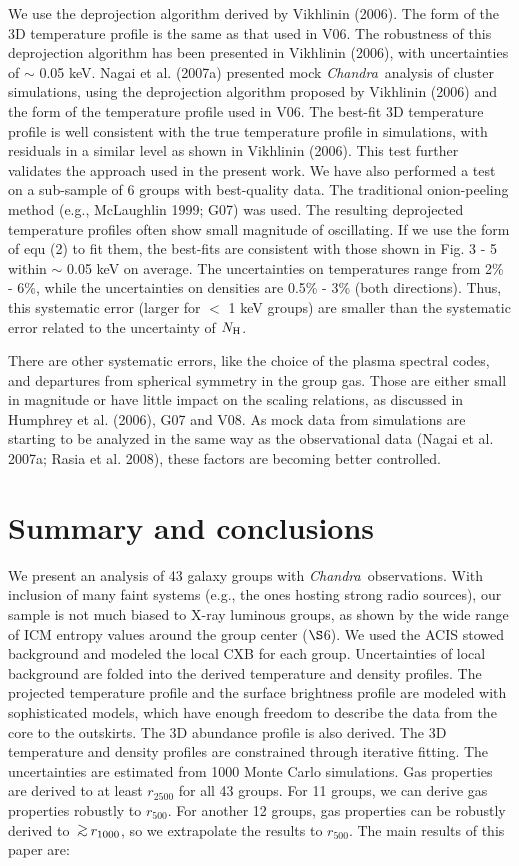 \documentclass{aastex}
\newcommand{\gsim}{\mbox{\hspace{.2em}\raisebox{.5ex}{$>$}\hspace{-.8em}\raisebox{-.5ex}{$\sim$}\hspace{.2em}}}
\def\chandra    {{\em Chandra}\/}
\begin{document}
We use the deprojection algorithm derived by Vikhlinin (2006). The form of the
3D temperature profile is the same as that used in V06.
The robustness of this deprojection algorithm has been presented in Vikhlinin (2006),
with uncertainties of $\sim$ 0.05 keV. Nagai et al. (2007a) presented mock \chandra\
analysis of cluster simulations, using the deprojection algorithm proposed by
Vikhlinin (2006) and the form of the temperature profile used in V06. The best-fit
3D temperature profile is well consistent with the true temperature profile in simulations,
with residuals in a similar level as shown in Vikhlinin (2006). This test further
validates the approach used in the present work. We have also performed a test
on a sub-sample of 6 groups with best-quality data. The traditional onion-peeling
method (e.g., McLaughlin 1999; G07) was used. The resulting deprojected temperature
profiles often show small magnitude of oscillating. If we use the form of equ (2)
to fit them, the best-fits are consistent with those shown in Fig. 3 - 5 within
$\sim$ 0.05 keV on average. The uncertainties on temperatures range from 2\% - 6\%,
while the uncertainties on densities are 0.5\% - 3\% (both directions).
Thus, this systematic error (larger for $<$ 1 keV groups) are smaller than the
systematic error related to the uncertainty of $N_{\rm H}$.

There are other systematic errors, like the choice of the plasma spectral codes,
and departures from spherical symmetry in the group gas. Those are either small
in magnitude or have little impact on the scaling relations, as discussed in
Humphrey et al. (2006), G07 and V08. As mock data from simulations are starting
to be analyzed in the same way as the observational data (Nagai et al. 2007a;
Rasia et al. 2008), these factors are becoming better controlled.

\section{Summary and conclusions}

We present an analysis of 43 galaxy groups with \chandra\ observations. With inclusion of
many faint systems (e.g., the ones hosting strong radio sources), our sample is not
much biased to X-ray luminous groups, as shown by the wide range of ICM entropy
values around the group center ($\S$6). We used the ACIS stowed background and
modeled the local CXB for each group. Uncertainties of local background are folded
into the derived temperature and density profiles. The projected temperature profile and
the surface brightness profile are modeled with sophisticated models, which have
enough freedom to describe the data from the core to the outskirts. The 3D abundance
profile is also derived. The 3D temperature and density profiles are constrained
through iterative fitting. The uncertainties are estimated from 1000 Monte Carlo
simulations. Gas properties are derived to at least $r_{2500}$ for all 43 groups.
For 11 groups, we can derive gas properties robustly to $r_{500}$. For another
12 groups, gas properties can be robustly derived to $\gsim r_{1000}$, so we
extrapolate the results to $r_{500}$. The main results of this paper are:
\end{document}
